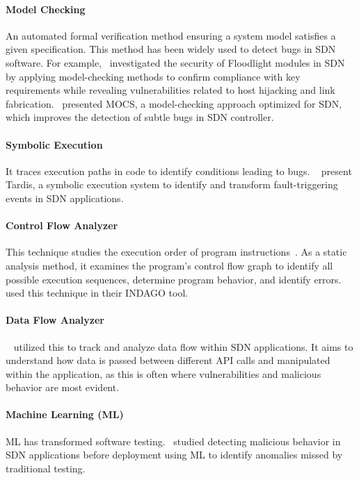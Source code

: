 \paragraph{Model Checking} An automated formal verification method ensuring a system model satisfies a given specification. This method has been widely used to detect bugs in SDN software. For example,~\cite{Xiang2019} investigated the security of Floodlight modules in SDN by applying model-checking methods to confirm compliance with key requirements while revealing vulnerabilities related to host hijacking and link fabrication.~\cite{10.1007/978-3-030-53291-8_8} presented MOCS, a model-checking approach optimized for SDN, which improves the detection of subtle bugs in SDN controller.

\paragraph{Symbolic Execution} It traces execution paths in code to identify conditions leading to bugs. ~\cite{10.1145/3482898.3483355} present Tardis, a symbolic execution system to identify and transform fault-triggering events in SDN applications.

\paragraph{Control Flow Analyzer} This technique studies the execution order of program instructions~\cite{wcfa}. As a static analysis method, it examines the program's control flow graph to identify all possible execution sequences, determine program behavior, and identify errors.~\cite{8526819} used this technique in their INDAGO tool.

\paragraph{Data Flow Analyzer}~\cite{8526819} utilized this to track and analyze data flow within SDN applications. It aims to understand how data is passed between different API calls and manipulated within the application, as this is often where vulnerabilities and malicious behavior are most evident.

\paragraph{Machine Learning (ML)} ML has transformed software testing.~\cite{8109275} studied detecting malicious behavior in SDN applications before deployment using ML to identify anomalies missed by traditional testing.

